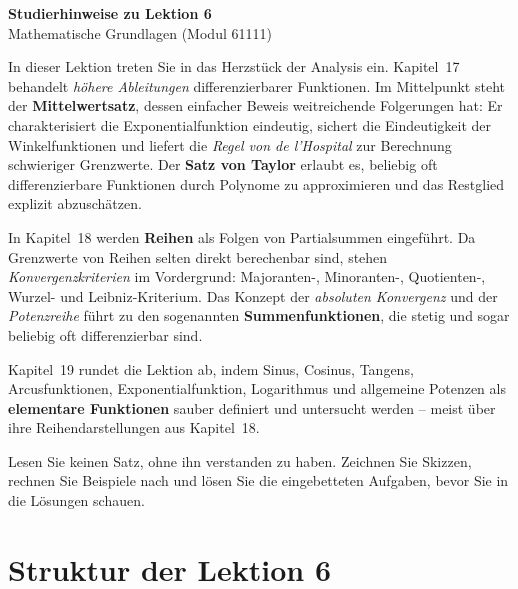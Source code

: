 \documentclass[a4paper,12pt]{article}
\begin{document}
\begin{center}
  {\LARGE\bfseries Studierhinweise zu Lektion 6}\\[0.5em]
  {\large Mathematische Grundlagen (Modul 61111)}
\end{center}

\vspace{1em}

In dieser Lektion treten Sie in das Herzstück der Analysis ein. Kapitel~17 behandelt
\emph{höhere Ableitungen} differenzierbarer Funktionen. Im Mittelpunkt steht der
\textbf{Mittelwertsatz}, dessen einfacher Beweis weitreichende Folgerungen hat: Er
charakterisiert die Exponentialfunktion eindeutig, sichert die Eindeutigkeit der
Winkelfunktionen und liefert die \emph{Regel von de l'Hospital} zur Berechnung
schwieriger Grenzwerte. Der \textbf{Satz von Taylor} erlaubt es, beliebig oft
differenzierbare Funktionen durch Polynome zu approximieren und das Restglied
explizit abzuschätzen.

In Kapitel~18 werden \textbf{Reihen} als Folgen von Partialsummen eingeführt.
Da Grenzwerte von Reihen selten direkt berechenbar sind, stehen
\emph{Konvergenzkriterien} im Vordergrund: Majoranten-, Minoranten-,
Quotienten-, Wurzel- und Leibniz-Kriterium. Das Konzept der \emph{absoluten
Konvergenz} und der \emph{Potenzreihe} führt zu den sogenannten
\textbf{Summenfunktionen}, die stetig und sogar beliebig oft differenzierbar sind.

Kapitel~19 rundet die Lektion ab, indem Sinus, Cosinus, Tangens,
Arcusfunktionen, Exponentialfunktion, Logarithmus und allgemeine Potenzen als
\textbf{elementare Funktionen} sauber definiert und untersucht werden -- meist
über ihre Reihendarstellungen aus Kapitel~18.

Lesen Sie keinen Satz, ohne ihn verstanden zu haben. Zeichnen Sie Skizzen,
rechnen Sie Beispiele nach und lösen Sie die eingebetteten Aufgaben, bevor
Sie in die Lösungen schauen.

\section*{Struktur der Lektion 6}
\end{document}
